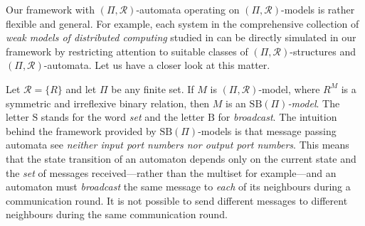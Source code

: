 \documentclass[copyright,creativecommons]{eptcs}
\begin{document}
Our framework with $(\Pi,\mathcal{R})$-automata
operating on $(\Pi,\mathcal{R})$-models is rather flexible
and general. For example, each system in 
the comprehensive collection of
\emph{weak models of distributed computing}
studied in \cite{hella, hella2} can be directly
simulated in our framework by restricting attention to suitable
classes of $(\Pi,\mathcal{R})$-structures and $(\Pi,\mathcal{R})$-automata.
Let us have a closer look at this matter.








Let $\mathcal{R} = \{R\}$ and let $\Pi$ be any finite set.
If $M$ is $(\Pi,\mathcal{R})$-model, where $R^M$ is a symmetric and irreflexive binary relation, then
$M$ is an \emph{$\mathrm{SB}(\Pi)$-model}. The letter $\mathrm{S}$ stands
for the word \emph{set} and the letter $\mathrm{B}$ for \emph{broadcast}.
The intuition behind the framework provided by $\mathrm{SB}(\Pi)$-models is that
message passing automata see \emph{neither input port numbers nor output port numbers}.
This means that the state transition of an automaton depends only on the
current state and the \emph{set} of messages received---rather than
the multiset for example---and an
automaton must \emph{broadcast} the same message to \emph{each} of its
neighbours during a communication round.
It is not possible to send different messages to different neighbours during the
same communication round.
\end{document}
